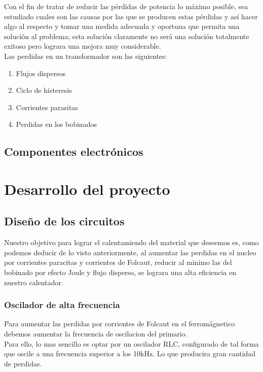 \documentclass[12pt]{article}
\begin{document}
Con el fin de tratar de reducir las pérdidas de potencia lo máximo posible, sea estudiado cuales son las causas por las que se producen estas pérdidas y así hacer algo al respecto y tomar una medida adecuada y oportuna que permita una solución al problema; esta solución claramente no será una solución totalmente exitoso pero lograra una mejora muy considerable. \\

Las perdidas en un transformador son las siguientes:

\begin{enumerate}
\item Flujos dispersos
\item Ciclo de histeresis
\item Corrientes parasitas
\item Perdidas en los bobinados
\end{enumerate}

\subsection{Componentes electrónicos}

\section{Desarrollo del proyecto}

\subsection{Diseño de los circuitos}
Nuestro objetivo para lograr el calentamiendo del material que deseemos es, como podemos deducir de lo visto anteriormente, al aumentar las perdidas en el nucleo por corrientes paracitas y corrientes de Folcaut, reducir al minimo las del bobinado por efecto Joule y flujo disperso, se lograra una alta eficiencia en nuestro calentador.

\subsubsection{Oscilador de alta frecuencia}
Para aumentar las perdidas por corrientes de Folcaut en el ferromágnetico debemos aumentar la frecuencia de oscilacion del primario. \\

Para ello, lo mas sencillo es optar por un oscilador RLC, configurado de tal forma que oscile a una frecuencia superior a los 10kHz. Lo que producira gran cantidad de perdidas.
\end{document}
